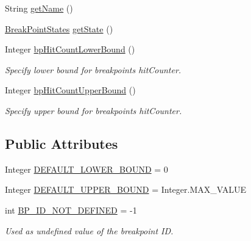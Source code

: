 \begin{DoxyCompactItemize}
\item 
String \hyperlink{interfacegov_1_1nasa_1_1jpf_1_1inspector_1_1interfaces_1_1_break_point_creation_information_a3417b55955320c81f68b2f2dc5eef7d9}{get\+Name} ()
\item 
\hyperlink{enumgov_1_1nasa_1_1jpf_1_1inspector_1_1interfaces_1_1_break_point_states}{Break\+Point\+States} \hyperlink{interfacegov_1_1nasa_1_1jpf_1_1inspector_1_1interfaces_1_1_break_point_creation_information_af471d172e5a442597709b20afe3d28e4}{get\+State} ()
\item 
Integer \hyperlink{interfacegov_1_1nasa_1_1jpf_1_1inspector_1_1interfaces_1_1_break_point_creation_information_a0732dfa7c7e94e3e28e7348a0594702b}{bp\+Hit\+Count\+Lower\+Bound} ()
\begin{DoxyCompactList}\small\item\em Specify lower bound for breakpoint\textquotesingle{}s hit\+Counter. \end{DoxyCompactList}\item 
Integer \hyperlink{interfacegov_1_1nasa_1_1jpf_1_1inspector_1_1interfaces_1_1_break_point_creation_information_a62389a60ba0878868c893d0a3d2efe56}{bp\+Hit\+Count\+Upper\+Bound} ()
\begin{DoxyCompactList}\small\item\em Specify upper bound for breakpoint\textquotesingle{}s hit\+Counter. \end{DoxyCompactList}\end{DoxyCompactItemize}
\subsection*{Public Attributes}
\begin{DoxyCompactItemize}
\item 
Integer \hyperlink{interfacegov_1_1nasa_1_1jpf_1_1inspector_1_1interfaces_1_1_break_point_creation_information_a40131b93f82a84ed5322c4dc5ca4175e}{D\+E\+F\+A\+U\+L\+T\+\_\+\+L\+O\+W\+E\+R\+\_\+\+B\+O\+U\+ND} = 0
\item 
Integer \hyperlink{interfacegov_1_1nasa_1_1jpf_1_1inspector_1_1interfaces_1_1_break_point_creation_information_af917e7de77b2a6fc93c24e1c5a4a5759}{D\+E\+F\+A\+U\+L\+T\+\_\+\+U\+P\+P\+E\+R\+\_\+\+B\+O\+U\+ND} = Integer.\+M\+A\+X\+\_\+\+V\+A\+L\+UE
\item 
int \hyperlink{interfacegov_1_1nasa_1_1jpf_1_1inspector_1_1interfaces_1_1_break_point_creation_information_a24626231e3744e59f505d0731d4ca9e1}{B\+P\+\_\+\+I\+D\+\_\+\+N\+O\+T\+\_\+\+D\+E\+F\+I\+N\+ED} = -\/1
\begin{DoxyCompactList}\small\item\em Used as undefined value of the breakpoint ID. \end{DoxyCompactList}\end{DoxyCompactItemize}


